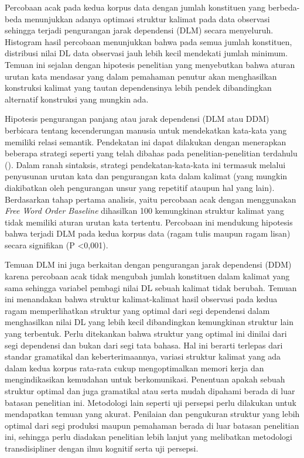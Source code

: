 Percobaan acak pada kedua korpus data dengan jumlah konstituen yang berbeda-beda menunjukkan adanya optimasi struktur kalimat pada data observasi sehingga terjadi pengurangan jarak dependensi (DLM) secara menyeluruh. Histogram hasil percobaan menunjukkan bahwa pada semua jumlah konstituen, distribusi nilai DL data observasi jauh lebih kecil mendekati jumlah minimum. Temuan ini sejalan dengan hipotesis penelitian \cite{hawkins2014cross} yang menyebutkan bahwa aturan urutan kata mendasar yang dalam pemahaman penutur akan menghasilkan konstruksi kalimat yang tautan dependensinya lebih pendek dibandingkan alternatif konstruksi yang mungkin ada.

Hipotesis pengurangan panjang atau jarak dependensi (DLM atau DDM) berbicara tentang kecenderungan manusia untuk mendekatkan kata-kata yang memiliki relasi semantik. Pendekatan ini dapat dilakukan dengan menerapkan beberapa strategi seperti yang telah dibahas pada penelitian-penelitian terdahulu (\citealp{jaeger2006redundancy, gildea2015human}). Dalam ranah sintaksis, strategi pendekatan-kata-kata ini termasuk melalui penyusunan urutan kata dan pengurangan kata dalam kalimat (yang mungkin diakibatkan oleh pengurangan unsur yang repetitif ataupun hal yang lain). Berdasarkan tahap pertama analisis, yaitu percobaan acak dengan menggunakan \textit{Free Word Order Baseline} \citep{futrell2015large} dihasilkan 100 kemungkinan struktur kalimat yang tidak memiliki aturan urutan kata tertentu. Percobaan ini mendukung hipotesis bahwa terjadi DLM pada kedua korpus data (ragam tulis maupun ragam lisan) secara signifikan (P \textless 0,001). 

Temuan DLM ini juga berkaitan dengan pengurangan jarak dependensi (DDM) karena percobaan acak tidak mengubah jumlah konstituen dalam kalimat yang sama sehingga variabel pembagi nilai DL sebuah kalimat tidak berubah. Temuan ini menandakan bahwa struktur kalimat-kalimat hasil observasi pada kedua ragam memperlihatkan struktur yang optimal dari segi dependensi dalam menghasilkan nilai DL yang lebih kecil dibandingkan kemungkinan struktur lain yang terbentuk. Perlu ditekankan bahwa struktur yang optimal ini dinilai dari segi dependensi dan bukan dari segi tata bahasa. Hal ini berarti terlepas dari standar gramatikal dan keberterimaannya, variasi struktur kalimat yang ada dalam kedua korpus rata-rata cukup mengoptimalkan memori kerja dan mengindikasikan kemudahan untuk berkomunikasi. Penentuan apakah sebuah struktur optimal dan juga gramatikal atau serta mudah dipahami berada di luar batasan penelitian ini. Metodologi lain seperti uji persepsi perlu dilakukan untuk mendapatkan temuan yang akurat. Penilaian dan pengukuran struktur yang lebih optimal dari segi produksi maupun pemahaman berada di luar batasan penelitian ini, sehingga perlu diadakan penelitian lebih lanjut yang melibatkan metodologi transdisipliner dengan ilmu kognitif serta uji persepsi.

